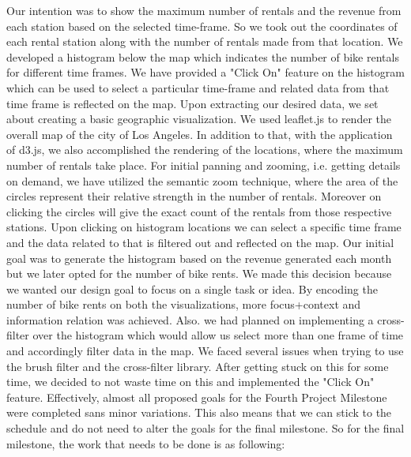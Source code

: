 Our intention was to show the maximum number of rentals and the revenue from each station based on the selected time-frame. So we took out the coordinates of each rental station along with the number of rentals made from that location. We developed a histogram below the map which indicates the number of bike rentals for different time frames. We have provided a "Click On" feature on the histogram which can be used to select a particular time-frame and related data from that time frame is reflected on the map. Upon extracting our desired data, we set about creating a basic geographic visualization. We used leaflet.js to render the overall map of the city of Los Angeles. In addition to that, with the application of d3.js, we also accomplished the rendering of the locations, where the maximum number of rentals take place. For initial panning and zooming, i.e. getting details on demand, we have utilized the semantic zoom technique, where the area of the circles represent their relative strength in the number of rentals. Moreover on clicking the circles will give the exact count of the rentals from those respective stations. Upon clicking on histogram locations we can select a specific time frame and the data related to that is filtered out and reflected on the map.\newline
Our initial goal was to generate the histogram based on the revenue generated each month but we later opted for the number of bike rents. We made this decision because we wanted our design goal to focus on a single task or idea. By encoding the number of bike rents on both the visualizations, more focus+context and information relation was achieved. Also. we had planned on implementing a cross-filter over the histogram which would allow us select more than one frame of time and accordingly filter data in the map. We faced several issues when trying to use the brush filter and the cross-filter library. After getting stuck on this for some time, we decided to not waste time on this and implemented the "Click On" feature.\newline
Effectively, almost all proposed goals for the Fourth Project Milestone were completed sans minor variations. This also means that we can stick to the schedule and do not need to alter the goals for the final milestone.
So for the final milestone, the work that needs to be done is as following:
\\\newline
